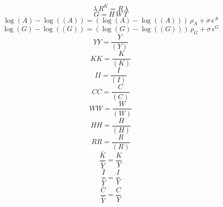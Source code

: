 \begin{dmath}
{\lambda}\, {R^{K}}={R}\, {\lambda}
\end{dmath}
\begin{dmath}
{G}={H}\, {W}\, {T}
\end{dmath}
\begin{dmath}
\log\left({A}\right)-\log\left(({A})\right)=\left(\log\left({A}\right)-\log\left(({A})\right)\right)\, {{\rho_{A}}}+{{\sigma}}\, {{\epsilon^{A}}}
\end{dmath}
\begin{dmath}
\log\left({G}\right)-\log\left(({G})\right)=\left(\log\left({G}\right)-\log\left(({G})\right)\right)\, {{\rho_{G}}}+{{\sigma}}\, {{\epsilon^{G}}}
\end{dmath}
\begin{dmath}
{YY}=\frac{{Y}}{({Y})}
\end{dmath}
\begin{dmath}
{KK}=\frac{{K}}{({K})}
\end{dmath}
\begin{dmath}
{II}=\frac{{I}}{({I})}
\end{dmath}
\begin{dmath}
{CC}=\frac{{C}}{({C})}
\end{dmath}
\begin{dmath}
{WW}=\frac{{W}}{({W})}
\end{dmath}
\begin{dmath}
{HH}=\frac{{H}}{({H})}
\end{dmath}
\begin{dmath}
{RR}=\frac{{R}}{({R})}
\end{dmath}
\begin{dmath}
{\frac{\bar{K}}{\bar{Y}}}=\frac{{K}}{{Y}}
\end{dmath}
\begin{dmath}
{\frac{\bar{I}}{\bar{Y}}}=\frac{{I}}{{Y}}
\end{dmath}
\begin{dmath}
{\frac{\bar{C}}{\bar{Y}}}=\frac{{C}}{{Y}}
\end{dmath}
